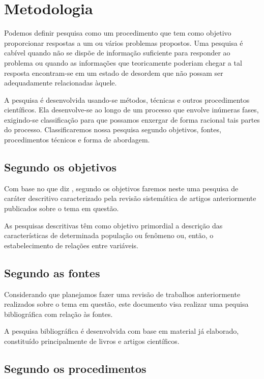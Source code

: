 \chapter{Metodologia}

Podemos definir pesquisa como um procedimento que tem como objetivo proporcionar respostas a um ou vários problemas propostos. Uma pesquisa é cabível quando não se dispõe de informação suficiente para responder ao problema ou quando as informações que teoricamente poderiam chegar a tal resposta encontram-se em um estado de desordem que não possam ser adequadamente relacionadas àquele.

A pesquisa é desenvolvida usando-se métodos, técnicas e outros procedimentos científicos. Ela desenvolve-se ao longo de um processo que envolve inúmeras fases, exigindo-se classificação para que possamos enxergar de forma racional tais partes do processo. Classificaremos nossa pesquisa segundo objetivos, fontes, procedimentos técnicos e forma de abordagem.

\section{Segundo os objetivos}

Com base no que diz \cite{AntonioCarlosGil}, segundo os objetivos faremos neste uma pesquisa de caráter descritivo caracterizado pela revisão sistemática de artigos anteriormente publicados sobre o tema em questão.

As pesquisas descritivas têm como objetivo primordial a descrição das características de determinada população ou fenômeno ou, então, o estabelecimento de relações entre variáveis.\cite[p.44]{AntonioCarlosGil}

\section{Segundo as fontes}

Considerando que planejamos fazer uma revisão de trabalhos anteriormente realizados sobre o tema em questão, este documento visa realizar uma pequisa bibliográfica com relação às fontes.

A pesquisa bibliográfica é desenvolvida com base em material já elaborado, constituído principalmente de livros e artigos científicos.\cite{AntonioCarlosGil}


\section{Segundo os procedimentos}

